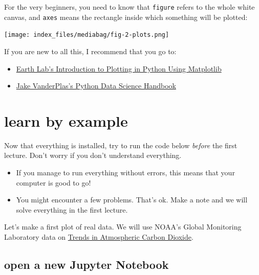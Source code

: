 \documentclass[
  letterpaper,
  DIV=11,
  numbers=noendperiod,
  oneside]{scrreprt}
\providecommand{\tightlist}{%
  \setlength{\itemsep}{0pt}\setlength{\parskip}{0pt}}\usepackage{longtable,booktabs,array}
\begin{document}
For the very beginners, you need to know that \texttt{figure} refers to
the whole white canvas, and \texttt{axes} means the rectangle inside
which something will be plotted:

\texttt{[image: index\_files/mediabag/fig-2-plots.png]}

If you are new to all this, I recommend that you go to:

\begin{itemize}
\tightlist
\item
  \href{https://www.earthdatascience.org/courses/scientists-guide-to-plotting-data-in-python/plot-with-matplotlib/introduction-to-matplotlib-plots/}{Earth
  Lab's Introduction to Plotting in Python Using Matplotlib}
\item
  \href{https://jakevdp.github.io/PythonDataScienceHandbook/index.html}{Jake
  VanderPlas's Python Data Science Handbook}
\end{itemize}

\hypertarget{learn-by-example}{%
\chapter{learn by example}\label{learn-by-example}}

Now that everything is installed, try to run the code below
\emph{before} the first lecture. Don't worry if you don't understand
everything.

\begin{itemize}
\tightlist
\item
  If you manage to run everything without errors, this means that your
  computer is good to go!
\item
  You might encounter a few problems. That's ok. Make a note and we will
  solve everything in the first lecture.
\end{itemize}

Let's make a first plot of real data. We will use NOAA's Global
Monitoring Laboratory data on
\href{https://gml.noaa.gov/ccgg/trends/data.html}{Trends in Atmospheric
Carbon Dioxide}.

\hypertarget{open-a-new-jupyter-notebook}{%
\section{open a new Jupyter
Notebook}\label{open-a-new-jupyter-notebook}}
\end{document}
